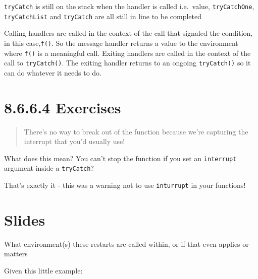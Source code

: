 \documentclass[]{book}
\begin{document}
\texttt{tryCatch} is still on the stack when the handler is called i.e.~value, \texttt{tryCatchOne}, \texttt{tryCatchList} and \texttt{tryCatch} are all still in line to be completed

Calling handlers are called in the context of the call that signaled the condition, in this case,\texttt{f()}. So the message handler returns a value to the environment where \texttt{f()} is a meaningful call. Exiting handlers are called in the context of the call to \texttt{tryCatch()}. The exiting handler returns to an ongoing \texttt{tryCatch()} so it can do whatever it needs to do.

\hypertarget{exercises-7}{%
\section*{8.6.6.4 Exercises}\label{exercises-7}}

\begin{quote}
There's no way to break out of the function because we're capturing the interrupt that you'd usually use!
\end{quote}

What does this mean? You can't stop the function if you set an \texttt{interrupt} argument inside a \texttt{tryCatch}?

That's exactly it - this was a warning not to use \texttt{inturrupt} in your functions!

\hypertarget{slides}{%
\section*{Slides}\label{slides}}

What environment(s) these restarts are called within, or if that even applies or matters

Given this little example:
\end{document}
